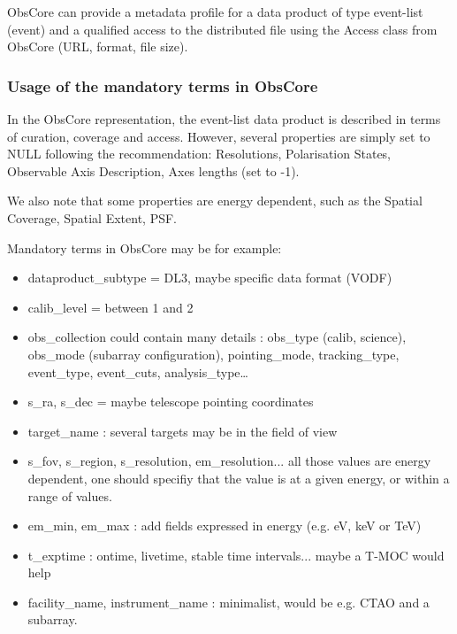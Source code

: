\documentclass[11pt,a4paper]{ivoa}
\begin{document}
{%
%


ObsCore \citep{2017ivoa.spec.0509L} can provide a metadata profile for a data product of type event-list (event) and a qualified access to the distributed file using the Access class from ObsCore (URL, format, file size).

\subsubsection{Usage of the mandatory terms in ObsCore}

In the ObsCore representation, the event-list data product is described in terms of curation, coverage and access. However, several properties are simply set to NULL following the recommendation: Resolutions, Polarisation States, Observable Axis Description, Axes lengths (set to -1).

We also note that some properties are energy dependent, such as the Spatial Coverage, Spatial Extent, PSF.


Mandatory terms in ObsCore may be for example:

\begin{itemize}
    \item dataproduct\_subtype = DL3, maybe specific data format (VODF)
    \item calib\_level = between 1 and 2
    \item obs\_collection could contain many details : obs\_type (calib, science), obs\_mode (subarray
configuration), pointing\_mode, tracking\_type, event\_type, event\_cuts, analysis\_type…
    \item s\_ra, s\_dec = maybe telescope pointing coordinates
    \item target\_name : several targets may be in the field of view
    \item s\_fov, s\_region, s\_resolution, em\_resolution... all those values are energy dependent, one should specifiy that the value is at a given energy, or within a range of values.
    \item em\_min, em\_max : add fields expressed in energy (e.g. eV, keV or TeV)
    \item t\_exptime : ontime, livetime, stable time intervals... maybe a T-MOC would help
    \item facility\_name, instrument\_name : minimalist, would be e.g. CTAO and a subarray.
\end{itemize}


}
\end{document}
